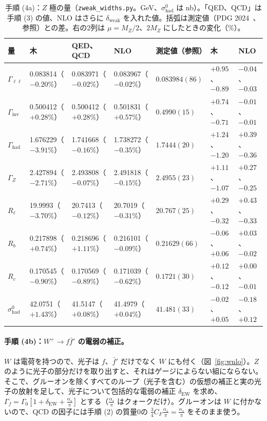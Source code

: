 \documentclass[a4paper,10pt]{ltjsarticle}
\begin{document}
\begin{table}[tbp]
\centering\footnotesize\setlength{\tabcolsep}{4pt}
\caption{手順 (4a)：$Z$ 極の量（\texttt{zweak\_widths.py}。GeV、$\sigma^0_{\mathrm{had}}$ は nb）。「QED、QCD」は手順 (3) の値、NLO はさらに $\delta_{\mathrm{weak}}$ を入れた値。括弧は測定値（PDG 2024~\cite{pdg24}、参照）との差。右の2列は $\mu=M_Z/2$、$2M_Z$ にしたときの変化（$\%$）。}
\label{tab:zpole}
\begin{tabular}{lllll|ll}
\toprule
量 & 木 & QED、QCD & NLO & 測定値（参照） & 木 & NLO \\
\midrule
$\Gamma_{\ell\ell}$ & 0.083814（$-0.20\%$） & 0.083971（$-0.02\%$） & 0.083967（$-0.02\%$） & $0.083984(86)$ & $+0.95$、$-0.89$ & $-0.04$、$-0.03$ \\
$\Gamma_{\mathrm{inv}}$ & 0.500412（$+0.28\%$） & 0.500412（$+0.28\%$） & 0.501831（$+0.57\%$） & $0.4990(15)$ & $+0.74$、$-0.71$ & $-0.01$、$-0.01$ \\
$\Gamma_{\mathrm{had}}$ & 1.676229（$-3.91\%$） & 1.741668（$-0.16\%$） & 1.738272（$-0.35\%$） & $1.7444(20)$ & $+1.24$、$-1.20$ & $+0.39$、$-0.36$ \\
$\Gamma_Z$ & 2.427894（$-2.71\%$） & 2.493808（$-0.07\%$） & 2.491818（$-0.15\%$） & $2.4955(23)$ & $+1.11$、$-1.07$ & $+0.27$、$-0.25$ \\
$R_\ell$ & 19.9993（$-3.70\%$） & 20.7413（$-0.12\%$） & 20.7019（$-0.31\%$） & $20.767(25)$ & $+0.29$、$-0.32$ & $+0.43$、$-0.33$ \\
$R_b$ & 0.217898（$+0.74\%$） & 0.218696（$+1.11\%$） & 0.216101（$-0.09\%$） & $0.21629(66)$ & $-0.06$、$+0.06$ & $+0.03$、$-0.02$ \\
$R_c$ & 0.170545（$-0.90\%$） & 0.170569（$-0.89\%$） & 0.171039（$-0.62\%$） & $0.1721(30)$ & $+0.12$、$-0.12$ & $+0.00$、$-0.01$ \\
$\sigma^0_{\mathrm{had}}$ & 42.0751（$+1.43\%$） & 41.5147（$+0.08\%$） & 41.4979（$+0.04\%$） & $41.481(33)$ & $-0.02$、$+0.05$ & $-0.18$、$+0.12$ \\
\bottomrule
\end{tabular}
\end{table}

\FloatBarrier
\paragraph{手順 (4b)：$W^+\to f\bar f'$ の電弱の補正。}$W$ は電荷を持つので、光子は $f$、$\bar f'$ だけでなく $W$ にも付く（図~\ref{fig:wnlo}）。$Z$ のように光子の部分だけを取り出すと、それはゲージによらない組にならない。そこで、グルーオンを除くすべてのループ（光子を含む）の仮想の補正と実の光子の放射を足して、光子について包括的な電弱の補正 $\delta_{\mathrm{EW}}$ を求め、$\Gamma_f=\Gamma_0[1+\delta_{\mathrm{EW}}+\frac{\alpha_s}\pi]$ とする（$\frac{\alpha_s}\pi$ はクォークだけ）。グルーオンは $W$ に付かないので、QCD の因子には手順 (2) の質量0の $\frac34C_F\frac{\alpha_s}\pi=\frac{\alpha_s}\pi$ をそのまま使う。
\end{document}
